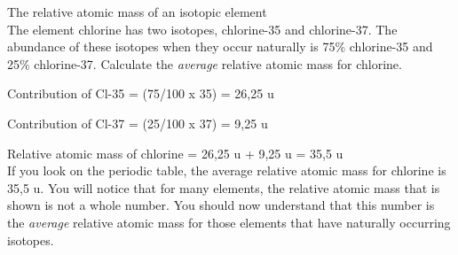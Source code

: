 \begin{wex}{The relative atomic mass of an isotopic element\\}{
The element chlorine has two isotopes, chlorine-35 and chlorine-37. The abundance of these isotopes when they occur naturally is 75\% chlorine-35 and 25\% chlorine-37. Calculate the \textit{average} relative atomic mass for chlorine.\\
}

{

Contribution of Cl-35 = (75/100 x 35) = 26,25 u\\
}
{

Contribution of Cl-37 = (25/100 x 37) = 9,25 u\\
}

{

Relative atomic mass of chlorine = 26,25 u + 9,25 u = 35,5 u \\

If you look on the periodic table, the average relative atomic mass for chlorine is 35,5 u. You will notice that for many elements, the relative atomic mass that is shown is not a whole number. You should now understand that this number is the \textit{average} relative atomic mass for those elements that have naturally occurring isotopes.}
\end{wex}



